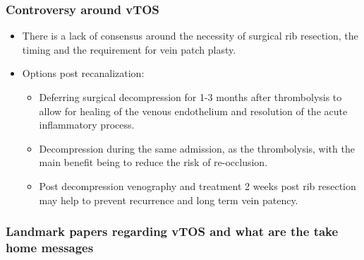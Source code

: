 \documentclass[
]{book}
\begin{document}
\hypertarget{controversy-around-vtos}{%
\subsubsection{Controversy around vTOS}\label{controversy-around-vtos}}

\begin{itemize}
\item
  There is a lack of consensus around the necessity of surgical rib
  resection, the timing and the requirement for vein patch plasty.
\item
  Options post recanalization:

  \begin{itemize}
  \item
    Deferring surgical decompression for 1-3 months after
    thrombolysis to allow for healing of the venous endothelium and
    resolution of the acute inflammatory process.
    \citep{humphries123ThoracicOutlet2019}
  \item
    Decompression during the same admission, as the thrombolysis,
    with the main benefit being to reduce the risk of re-occlusion.
    \citep{humphries123ThoracicOutlet2019, molinaPagetSchroetterSyndromeTreated2007}
  \item
    Post decompression venography and treatment 2 weeks post rib
    resection may help to prevent recurrence and long term vein
    patency. \citep{changRoutineVenographyFollowing2012}
  \end{itemize}
\end{itemize}

\hypertarget{landmark-papers-regarding-vtos-and-what-are-the-take-home-messages}{%
\subsubsection{Landmark papers regarding vTOS and what are the take home messages}\label{landmark-papers-regarding-vtos-and-what-are-the-take-home-messages}}
\end{document}
